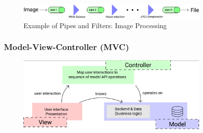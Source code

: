 \documentclass[
../../Software_Engineering_Summary.tex,
]
{subfiles}
\begin{document}
\begin{figure}
    [htp]
    \centering
    \includegraphics[width = 0.85\textwidth]{Pics/PipesAndFiltersExample.png}
    \caption{Example of Pipes and Filters: Image Processing}
\end{figure}

\subsubsection{Model-View-Controller (MVC)}
\begin{figure}
    [htp]
    \centering
    \includegraphics[width = 0.85\textwidth]{Pics/ModelViewController.png}
\end{figure}
\end{document}

